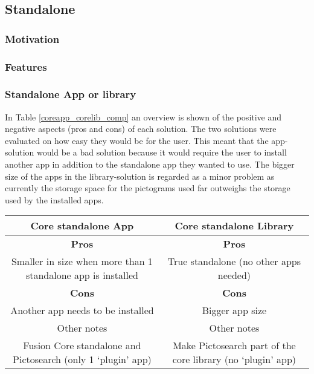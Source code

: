 \subsection{Standalone}

\subsubsection{Motivation}

\subsubsection{Features}

\subsubsection{Standalone App or library}

In Table \ref{coreapp_corelib_comp} an overview is shown of the positive and negative aspects (pros and cons) of each solution. The two solutions were evaluated on how easy they would be for the user. This meant that the app-solution would be a bad solution because it would require the user to install another app in addition to the standalone app they wanted to use. The bigger size of the apps in the library-solution is regarded as a minor problem as currently the storage space for the pictograms used far outweighs the storage used by the installed apps.

\begin{tabular}{|c|c|}
\hline Core standalone App & Core standalone Library \\ 
\hline \textbf{Pros} & \textbf{Pros} \\ 
\hline Smaller in size when more than 1 standalone app is installed & True standalone (no other apps needed) \\ 
\hline \textbf{Cons} & \textbf{Cons} \\ 
\hline Another app needs to be installed & Bigger app size \\ 
\hline Other notes & Other notes \\ 
\hline Fusion Core standalone and Pictosearch (only 1 ‘plugin’ app) & Make Pictosearch part of the core library
(no ‘plugin’ app) \\ 
\hline 
\end{tabular} 

